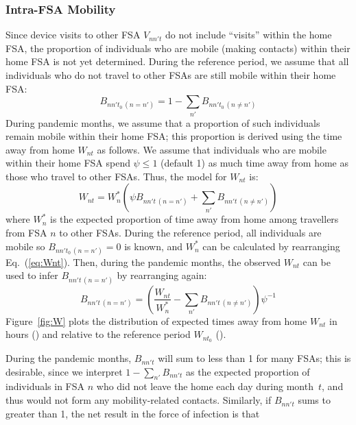 \subsubsection{Intra-FSA Mobility}\label{app.mob.intra}
Since device visits to other FSA $V_{nn't}$ do not include ``visits'' within the home FSA,
the proportion of individuals who are mobile (making contacts) within their home FSA is not yet determined.
During the reference period, we assume that
all individuals who do not travel to other FSAs are still mobile within their home FSA:
\begin{equation}\label{eq:Bnnt.intra.t0}
  B_{nn't_0\,(n = n')} = 1 - \sum_{n'} B_{nn't_0\,(n \ne n')}
\end{equation}
During pandemic months, we assume that
a proportion of such individuals remain mobile within their home FSA;
this proportion is derived using the time away from home $W_{nt}$ as follows.
We assume that individuals who are mobile within their home FSA
spend $\psi \le 1$ (default 1) as much time away from home as
those who travel to other FSAs.
Thus, the model for $W_{nt}$ is:
\begin{equation}\label{eq:Wnt}
  W_{nt} = W^*_n \left(\psi B_{nn't\,(n = n')} + \sum_{n'} B_{nn't\,(n \ne n')} \right)
\end{equation}
where $W^*_n$ is the expected proportion of time away from home
among travellers from FSA $n$ to other FSAs.
During the reference period, all individuals are mobile so $B_{nn't_0\,(n = n')} = 0$ is known, and
$W^*_n$ can be calculated by rearranging Eq.~(\ref{eq:Wnt}).
Then, during the pandemic months, the observed $W_{nt}$ can be used to infer $B_{nn't\,(n = n')}$
by rearranging again:
\begin{equation}\label{eq:Bnnt.intra.t}
  B_{nn't\,(n = n')} = \left(\frac{W_{nt}}{W^*_n} - \sum_{n'} B_{nn't\,(n \ne n')}\right) \psi^{-1}
\end{equation}
Figure~\ref{fig:W} plots the distribution of expected times away from home $W_{nt}$
in hours () and relative to the reference period $W_{nt_0}$ ().
\par
During the pandemic months, $B_{nn't}$ will sum to less than 1 for many FSAs;
this is desirable, since we interpret $1 - \sum_{n'} B_{nn't}$ as
the expected proportion of individuals in FSA $n$
who did not leave the home each day during month~$t$,
and thus would not form any mobility-related contacts.
Similarly, if $B_{nn't}$ sums to greater than 1, the net result in the force of infection is that
